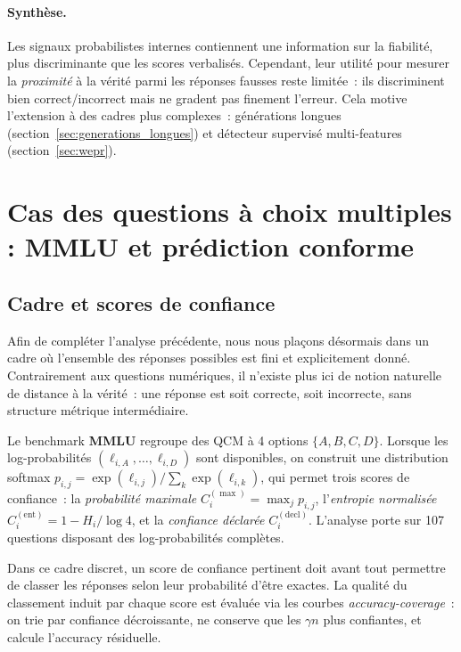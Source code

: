 \documentclass[12pt,a4paper]{article}
\begin{document}
\paragraph{Synthèse.}
Les signaux probabilistes internes contiennent une information sur la fiabilité, plus discriminante que les scores verbalisés. Cependant, leur utilité pour mesurer la \emph{proximité} à la vérité parmi les réponses fausses reste limitée~: ils discriminent bien correct/incorrect mais ne gradent pas finement l'erreur. Cela motive l'extension à des cadres plus complexes~: générations longues (section~\ref{sec:generations_longues}) et détecteur supervisé multi-features (section~\ref{sec:wepr}).


\section{Cas des questions à choix multiples : MMLU et prédiction conforme}
\label{sec:qcm}

\subsection{Cadre et scores de confiance}

Afin de compléter l’analyse précédente, nous nous plaçons désormais dans un cadre où l’ensemble des réponses possibles est fini et explicitement donné. Contrairement aux questions numériques, il n’existe plus ici de notion naturelle de distance à la vérité~: une réponse est soit correcte, soit incorrecte, sans structure métrique intermédiaire.

Le benchmark \textbf{MMLU} regroupe des QCM à 4 options $\{A,B,C,D\}$. Lorsque les log-probabilités $(\ell_{i,A}, \ldots, \ell_{i,D})$ sont disponibles, on construit une distribution softmax $p_{i,j} = \exp(\ell_{i,j}) / \sum_k \exp(\ell_{i,k})$, qui permet trois scores de confiance~: la \emph{probabilité maximale} $C^{(\max)}_i = \max_j p_{i,j}$, l'\emph{entropie normalisée} $C^{(\text{ent})}_i = 1 - H_i / \log 4$, et la \emph{confiance déclarée} $C^{(\text{decl})}_i$. L'analyse porte sur 107 questions disposant des log-probabilités complètes.

Dans ce cadre discret, un score de confiance pertinent doit avant tout permettre de classer les réponses selon leur probabilité d’être exactes. La qualité du classement induit par chaque score est évaluée via les courbes \emph{accuracy-coverage}~: on trie par confiance décroissante, ne conserve que les $\gamma n$ plus confiantes, et calcule l'accuracy résiduelle.
\end{document}
